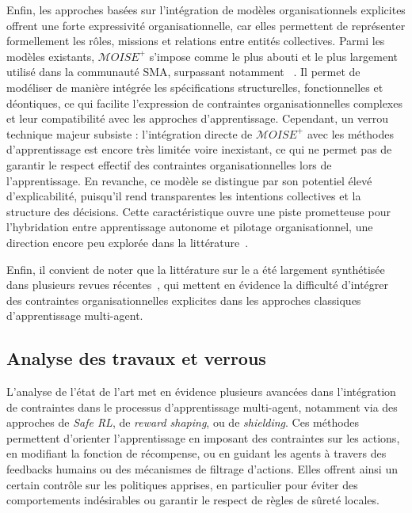 Enfin, les approches basées sur l'intégration de modèles organisationnels explicites offrent une forte expressivité organisationnelle, car elles permettent de représenter formellement les rôles, missions et relations entre entités collectives. Parmi les modèles existants, $\mathcal{M}OISE^+$ s'impose comme le plus abouti et le plus largement utilisé dans la communauté SMA, surpassant notamment ~\cite{Ferber2004}. Il permet de modéliser de manière intégrée les spécifications structurelles, fonctionnelles et déontiques, ce qui facilite l'expression de contraintes organisationnelles complexes et leur compatibilité avec les approches d'apprentissage.
%
Cependant, un verrou technique majeur subsiste : l'intégration directe de $\mathcal{M}OISE^+$ avec les méthodes d'apprentissage est encore très limitée voire inexistant, ce qui ne permet pas de garantir le respect effectif des contraintes organisationnelles lors de l'apprentissage. En revanche, ce modèle se distingue par son potentiel élevé d'explicabilité, puisqu'il rend transparentes les intentions collectives et la structure des décisions. Cette caractéristique ouvre une piste prometteuse pour l'hybridation entre apprentissage autonome et pilotage organisationnel, une direction encore peu explorée dans la littérature~\cite{bordini2006jade, chernova2014robot}.

\medskip

\noindent
Enfin, il convient de noter que la littérature sur le  a été largement synthétisée dans plusieurs revues récentes~\cite{Zhang2021, Papoudakis2021}, qui mettent en évidence la difficulté d'intégrer des contraintes organisationnelles explicites dans les approches classiques d'apprentissage multi-agent.

\subsection*{Analyse des travaux et verrous}

L'analyse de l'état de l'art met en évidence plusieurs avancées dans l'intégration de contraintes dans le processus d'apprentissage multi-agent, notamment via des approches de \textit{Safe RL}, de \textit{reward shaping}, ou de \textit{shielding}. Ces méthodes permettent d'orienter l'apprentissage en imposant des contraintes sur les actions, en modifiant la fonction de récompense, ou en guidant les agents à travers des feedbacks humains ou des mécanismes de filtrage d'actions. Elles offrent ainsi un certain contrôle sur les politiques apprises, en particulier pour éviter des comportements indésirables ou garantir le respect de règles de sûreté locales.

